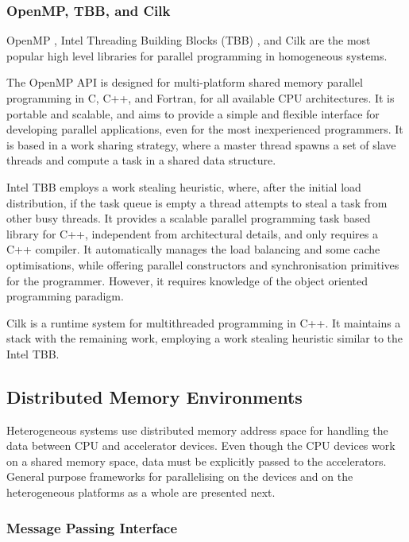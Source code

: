 \subsubsection*{OpenMP, TBB, and Cilk}

OpenMP \cite{OpenMP}, Intel Threading Building Blocks (TBB) \cite{Intel:TBB}, and Cilk \cite{Intel:Cilk} are the most popular high level libraries for parallel programming in homogeneous systems.

The OpenMP API is designed for multi-platform shared memory parallel programming in C, C++, and Fortran, for all available CPU architectures. It is portable and scalable, and aims to provide a simple and flexible interface for developing parallel applications, even for the most inexperienced programmers. It is based in a work sharing strategy, where a master thread spawns a set of slave threads and compute a task in a shared data structure.

Intel TBB employs a work stealing heuristic, where, after the initial load distribution, if the task queue is empty a thread attempts to steal a task from other busy threads. It provides a scalable parallel programming task based library for C++, independent from architectural details, and only requires a C++ compiler. It automatically manages the load balancing and some cache optimisations, while offering parallel constructors and synchronisation primitives for the programmer. However, it requires knowledge of the object oriented programming paradigm.

Cilk is a runtime system for multithreaded programming in C++. It maintains a stack with the remaining work, employing a work stealing heuristic similar to the Intel TBB.

\subsection{Distributed Memory Environments}
\label{distributed_mem}

Heterogeneous systems use distributed memory address space for handling the data between CPU and accelerator devices. Even though the CPU devices work on a shared memory space, data must be explicitly passed to the accelerators. General purpose frameworks for parallelising on the devices and on the heterogeneous platforms as a whole are presented next.

\subsubsection*{Message Passing Interface}

